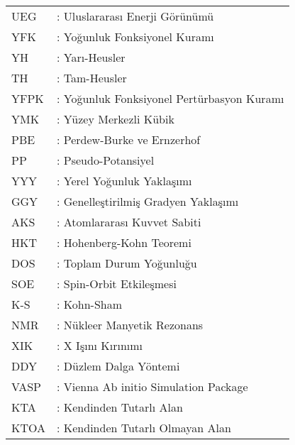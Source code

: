 \hspace{-3mm}
\begin{tabular}{p{2cm}l}
{ {UEG}} & { :} Uluslararası Enerji Görünümü\\
{  YFK} & { :} Yoğunluk Fonksiyonel Kuramı\\
{  YH} & { :} Yarı-Heusler\\
{  TH} & { :} Tam-Heusler\\
{  YFPK} & { :} Yoğunluk Fonksiyonel Pertürbasyon Kuramı\\
{  YMK} & { :} Yüzey Merkezli Kübik\\
{  PBE} & { :} Perdew-Burke ve Ernzerhof\\
{  PP} & { :} Pseudo-Potansiyel\\
{  YYY} & { :} Yerel Yoğunluk Yaklaşımı\\
{  GGY} & { :} Genelleştirilmiş Gradyen Yaklaşımı\\
{  AKS} & { :} Atomlararası Kuvvet Sabiti\\
{  HKT} & { :} Hohenberg-Kohn Teoremi\\
{  DOS} & { :} Toplam Durum Yoğunluğu\\
{  SOE} & { :} Spin-Orbit Etkileşmesi\\
{  K-S} & { :} Kohn-Sham\\
{  NMR} & { :} Nükleer Manyetik Rezonans\\
{  XIK} & { :} X Işını Kırınımı\\
{  DDY} & { :} Düzlem Dalga Yöntemi\\
{  VASP} & { :} Vienna Ab initio Simulation Package\\
{  KTA} & { :} Kendinden Tutarlı Alan\\
{  KTOA} & { :} Kendinden Tutarlı Olmayan Alan\\
\end{tabular}